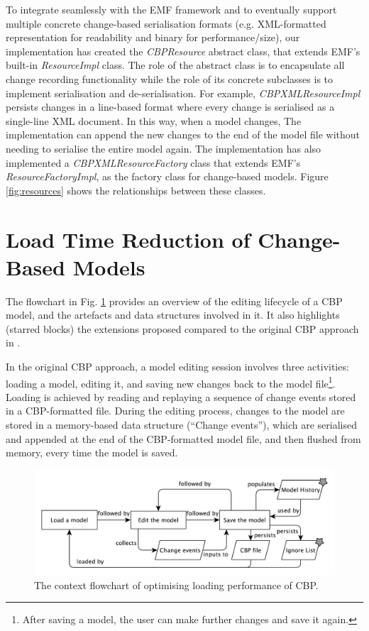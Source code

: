 \documentclass[12pt, a4paper]{report} \usepackage[titletoc]{appendix}
\begin{document}
To integrate seamlessly with the EMF framework and to eventually support multiple concrete change-based serialisation formats (e.g. XML-formatted representation for readability and binary for performance/size), our implementation has created the \emph{CBPResource} abstract class, that extends EMF's built-in \emph{ResourceImpl} class. The role of the abstract class is to encapsulate all change recording functionality while the role of its concrete subclasses is to implement serialisation and de-serialisation. For example, \emph{CBPXMLResourceImpl} persists changes in a line-based format where every change is serialised as a single-line XML document. In this way, when a model changes, The implementation can append the new changes to the end of the model file without needing to serialise the entire model again. The implementation has also implemented a \emph{CBPXMLResourceFactory} class that extends EMF's \emph{ResourceFactoryImpl}, as the factory class for change-based models. Figure \ref{fig:resources} shows the relationships between these classes.



\section{Load Time Reduction of Change-Based Models}
\label{sec:load_time_reduction_of_change-based_models}
The flowchart in Fig. \ref{fig:flowchart} provides an overview of the editing lifecycle of a CBP model, and the artefacts and data structures involved in it. It also highlights (starred blocks) the extensions proposed compared to the original CBP approach in \cite{yohannis2017turning}.

In the original CBP approach, a model editing session involves three activities: loading a model, editing it, and saving new changes back to the model file\footnote{After saving a model, the user can make further changes and save it again.}. Loading is achieved by reading and replaying a sequence of change events stored in a CBP-formatted file. During the editing process, changes to the model are stored in a memory-based data structure (``Change events''), which are serialised and appended at the end of the CBP-formatted model file, and then flushed from memory, every time the model is saved.

\begin{figure}[ht]
	\centering
	\includegraphics[width=\linewidth]{flowchart}
	\caption{The context flowchart of optimising loading performance of CBP.}
	\label{fig:flowchart}
\end{figure}
\end{document}
